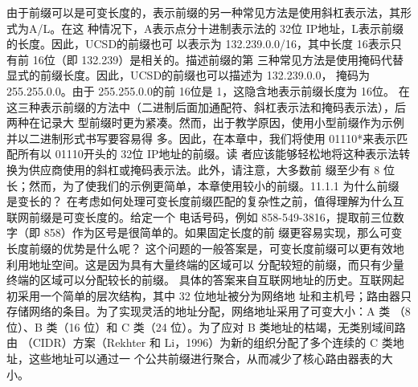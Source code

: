由于前缀可以是可变长度的，表示前缀的另一种常见方法是使用斜杠表示法，其形式为A/L。在这
种情况下，A表示点分十进制表示法的 32位 IP地址，L表示前缀的长度。因此，UCSD的前缀也可
以表示为 132.239.0.0/16，其中长度 16表示只有前 16位（即 132.239）是相关的。描述前缀的第
三种常见方法是使用掩码代替显式的前缀长度。因此，UCSD的前缀也可以描述为 132.239.0.0，
掩码为 255.255.0.0。由于 255.255.0.0的前 16位是 1，这隐含地表示前缀长度为 16位。
在这三种表示前缀的方法中（二进制后面加通配符、斜杠表示法和掩码表示法），后两种在记录大
型前缀时更为紧凑。然而，出于教学原因，使用小型前缀作为示例并以二进制形式书写要容易得
多。因此，在本章中，我们将使用 01110*来表示匹配所有以 01110开头的 32位 IP地址的前缀。读
者应该能够轻松地将这种表示法转换为供应商使用的斜杠或掩码表示法。此外，请注意，大多数前
缀至少有 8 位长；然而，为了使我们的示例更简单，本章使用较小的前缀。11.1.1 为什么前缀
是变长的？
在考虑如何处理可变长度前缀匹配的复杂性之前，值得理解为什么互联网前缀是可变长度的。给定一个
电话号码，例如 858-549-3816，提取前三位数字（即 858）作为区号是很简单的。如果固定长度的前
缀更容易实现，那么可变长度前缀的优势是什么呢？
这个问题的一般答案是，可变长度前缀可以更有效地利用地址空间。这是因为具有大量终端的区域可以
分配较短的前缀，而只有少量终端的区域可以分配较长的前缀。
具体的答案来自互联网地址的历史。互联网起初采用一个简单的层次结构，其中 32 位地址被分为网络地
址和主机号；路由器只存储网络的条目。为了实现灵活的地址分配，网络地址采用了可变大小：A 类
（8 位）、B 类（16 位）和 C 类（24 位）。为了应对 B 类地址的枯竭，无类别域间路由
（CIDR）方案（Rekhter 和 Li，1996）为新的组织分配了多个连续的 C 类地址，这些地址可以通过一
个公共前缀进行聚合，从而减少了核心路由器表的大小。

